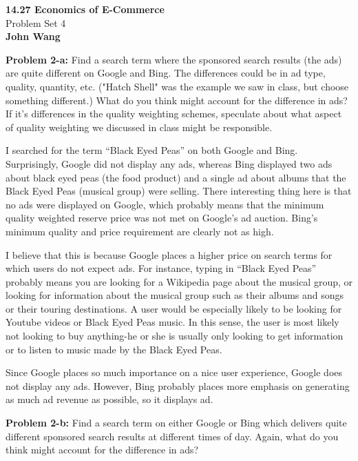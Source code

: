 \documentclass[psamsfonts]{amsart}
\newenvironment{sol}{\vspace{0.25cm}{\large \bfseries Solution:}}{\qedsymbol}
\newenvironment{prob}[1]{\begin{framed}{\large \bfseries Problem #1:}}{\end{framed}}
\newcommand{\makenewtitle}{
    \begin{center}
    {\huge \bfseries 14.27 Economics of E-Commerce} \\
    Problem Set 4\\
    \vspace{0.25cm}
    {\bfseries John Wang} 
    \end{center}
    \vspace{0.5cm}
}
\begin{document}
\makenewtitle

\begin{prob}{2-a}
Find a search term where the sponsored search results (the ads) are quite different on Google and Bing.  The differences could be in ad type, quality, quantity, etc.  ("Hatch Shell" was the example we saw in class, but choose something different.)  What do you think might account for the difference in ads?  If it's differences in the quality weighting schemes, speculate about what aspect of quality weighting we discussed in class might be responsible.
\end{prob}

\begin{sol}
I searched for the term ``Black Eyed Peas'' on both Google and Bing. Surprisingly, Google did not display any ads, whereas Bing displayed two ads about black eyed peas (the food product) and a single ad about albums that the Black Eyed Peas (musical group) were selling. There interesting thing here is that no ads were displayed on Google, which probably means that the minimum quality weighted reserve price was not met on Google's ad auction. Bing's minimum quality and price requirement are clearly not as high. 

I believe that this is because Google places a higher price on search terms for which users do not expect ads. For instance, typing in ``Black Eyed Peas'' probably means you are looking for a Wikipedia page about the musical group, or looking for information about the musical group such as their albums and songs or their touring destinations. A user would be especially likely to be looking for Youtube videos or Black Eyed Peas music. In this sense, the user is most likely not looking to buy anything-he or she is usually only looking to get information or to listen to music made by the Black Eyed Peas.

Since Google places so much importance on a nice user experience, Google does not display any ads. However, Bing probably places more emphasis on generating as much ad revenue as possible, so it displays ad.
\end{sol}

\begin{prob}{2-b}
Find a search term on either Google or Bing which delivers quite different sponsored search results at different times of day. Again, what do you think might account for the difference in ads?
\end{prob}
\begin{sol}

\end{sol}
\end{document}
